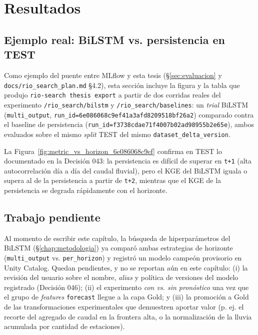 \chapter{Resultados}
\label{chap:resultados}

\section{Ejemplo real: BiLSTM vs. persistencia en TEST}

Como ejemplo del puente entre MLflow y esta tesis (\S\ref{sec:evaluacion} y
\texttt{docs/rio\_search\_plan.md} \S4.2), esta secci\'on incluye la figura y la tabla que produjo
\texttt{rio-search thesis export} a partir de dos corridas reales del experimento
\texttt{/rio\_search/bilstm} y \texttt{/rio\_search/baselines}: un \emph{trial} BiLSTM
(\texttt{multi\_output}, \texttt{run\_id=6e086068c9ef41a3afd8209518bf26a2}) comparado contra el
baseline de persistencia (\texttt{run\_id=f3738cdae71f4007b02ad98955b2e65e}), ambos evaluados sobre
el mismo \emph{split} TEST del mismo \texttt{dataset\_delta\_version}.



La Figura~\ref{fig:metric_vs_horizon_6e086068c9ef} confirma en TEST lo documentado en la
Decisi\'on 043: la persistencia es dif\'icil de superar en \texttt{t+1} (alta autocorrelaci\'on
d\'ia a d\'ia del caudal fluvial), pero el KGE del BiLSTM iguala o supera al de la persistencia a
partir de \texttt{t+2}, mientras que el KGE de la persistencia se degrada r\'apidamente con el
horizonte.





\section{Trabajo pendiente}
\label{sec:trabajo-futuro}

Al momento de escribir este cap\'itulo, la b\'usqueda de hiperpar\'ametros del BiLSTM
(\S\ref{chap:metodologia}) ya compar\'o ambas estrategias de horizonte (\texttt{multi\_output} vs.
\texttt{per\_horizon}) y registr\'o un modelo campe\'on provisorio en Unity Catalog. Quedan
pendientes, y no se reportan a\'un en este cap\'itulo: (i) la revisi\'on del usuario sobre el
nombre, \emph{alias} y pol\'itica de versiones del modelo registrado (Decisi\'on 046); (ii) el
experimento \emph{con vs. sin pron\'ostico} una vez que el grupo de \emph{features}
\texttt{forecast} llegue a la capa Gold; y (iii) la promoci\'on a Gold de las transformaciones
experimentales que demuestren aportar valor (p. ej. el recorte del agregado de caudal en la
frontera alta, o la normalizaci\'on de la lluvia acumulada por cantidad de estaciones).
